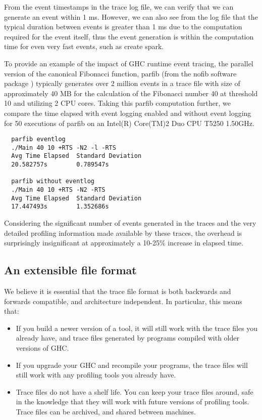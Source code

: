 \documentclass[twocolumn,9pt]{sigplanconf}
\newcommand{\codef}[1]{{\fontfamily{cmss}\small#1}}
\begin{document}
From the event timestamps in the trace log file, we can verify that we can 
generate an event within 1 ms.  However, we can also see from the log file that
the typical duration between events is greater than 1 ms due to the computation 
required for the event itself, thus the event generation is within
the computation time for even very fast events, such as create spark.

To provide an example of the impact of GHC runtime event tracing, the parallel 
version of the canonical Fibonacci function, \codef{parfib} (from
the \codef{nofib} software package \cite{nofib}) typically generates over 2 million
events in a trace file with size of approximately 40 MB for the
calculation of the Fibonacci number 40 at threshold 10 and utilizing 2 CPU cores.
Taking this parfib computation further, we compare the time elapsed with
event logging enabled and without event logging for 50 executions of
parfib on an Intel(R) Core(TM)2 Duo CPU T5250 1.50GHz.

\begin{verbatim}
  parfib eventlog 
  ./Main 40 10 +RTS -N2 -l -RTS
  Avg Time Elapsed  Standard Deviation
  20.582757s        0.789547s

  parfib without eventlog 
  ./Main 40 10 +RTS -N2 -RTS
  Avg Time Elapsed  Standard Deviation
  17.447493s        1.352686s
\end{verbatim}

Considering the significant number of events generated in the traces and
the very detailed profiling information made available by these traces, 
the overhead is surprisingly insignificant at approximately a 10-25\%
increase in elapsed time.

\subsection{An extensible file format}

We believe it is essential that the trace file format is both
backwards and forwards compatible, and architecture independent.  In
particular, this means that:

\begin{itemize}
\item If you build a newer version of a tool, it will still work with
  the trace files you already have, and trace files generated by
  programs compiled with older versions of GHC.

\item If you upgrade your GHC and recompile your programs, the trace
  files will still work with any profiling tools you already have.

\item Trace files do not have a shelf life.  You can keep your trace
  files around, safe in the knowledge that they will work with future
  versions of profiling tools.  Trace files can be archived, and
  shared between machines.
\end{itemize}
\end{document}
